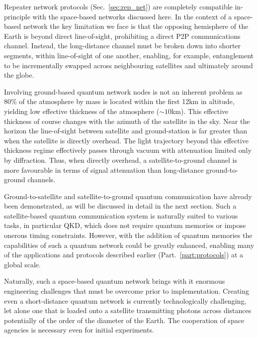 Repeater network protocols (Sec.~\ref{sec:rep_net}) are completely compatible in-principle with the space-based networks discussed here. In the context of a space-based network the key limitation we face is that the opposing hemisphere of the Earth is beyond direct line-of-sight, prohibiting a direct P2P communications channel. Instead, the long-distance channel must be broken down into shorter segments, within line-of-sight of one another, enabling, for example, entanglement to be incrementally swapped across neighbouring satellites and ultimately around the globe.

Involving ground-based quantum network nodes is not an inherent problem as 80\% of the atmosphere by mass is located within the first 12km in altitude, yielding low effective thickness of the atmosphere ($\sim10$km). This effective thickness of course changes with the azimuth of the satellite in the sky. Near the horizon the line-of-sight between satellite and ground-station is far greater than when the satellite is directly overhead. The light trajectory beyond this effective thickness regime effectively passes through vacuum with attenuation limited only by diffraction. Thus, when directly overhead, a satellite-to-ground channel is more favourable in terms of signal attenuation than long-distance ground-to-ground channels.

Ground-to-satellite and satellite-to-ground quantum communication have already been demonstrated, as will be discussed in detail in the next section. Such a satellite-based quantum communication system is naturally suited to various tasks, in particular QKD, which does not require quantum memories or impose onerous timing constraints. However, with the addition of quantum memories the capabilities of such a quantum network could be greatly enhanced, enabling many of the applications and protocols described earlier (Part.~\ref{part:protocols}) at a global scale.

Naturally, such a space-based quantum network brings with it enormous engineering challenges that must be overcome prior to implementation. Creating even a short-distance quantum network is currently technologically challenging, let alone one that is loaded onto a satellite transmitting photons across distances potentially of the order of the diameter of the Earth. The cooperation of space agencies is necessary even for initial experiments.

